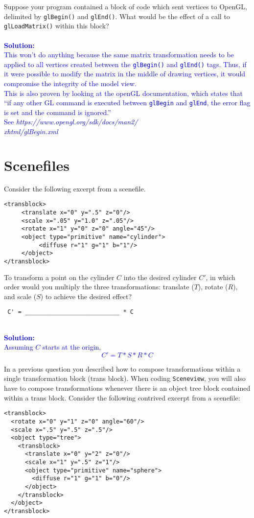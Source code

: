 \documentclass[10pt,twocolumn]{article}
\newcommand{\solution}[1]{\textcolor{Blue}{\\{\bf Solution:} \\ #1}}  %
\begin{document}
\begin{framed}
 Suppose your program contained a block of code which sent vertices to OpenGL, delimited by {\tt glBegin()} and {\tt glEnd()}. What would be the effect of a call to {\tt glLoadMatrix()} within this block?\\[5mm]
\solution{
This won't do anything because the same matrix transformation needs to be applied to all vertices created between the {\tt glBegin()} and {\tt glEnd()} tags. Thus, if it were possible to modify the matrix in the middle of drawing vertices, it would compromise the integrity of the model view. \\[5mm]
This is also proven by looking at the openGL documentation, which states that ``if any other GL command is executed between {\tt glBegin} and {\tt glEnd}, the error flag is set and the command is ignored.''\\[5mm]
See {\it https://www.opengl.org/sdk/docs/man2/\\xhtml/glBegin.xml}
}
\end{framed}

\section{Scenefiles}
Consider the following excerpt from a scenefile.
\begin{verbatim}
<transblock>
     <translate x="0" y=".5" z="0"/>
     <scale x=".05" y="1.0" z=".05"/>
     <rotate x="1" y="0" z="0" angle="45"/>
     <object type="primitive" name="cylinder">
          <diffuse r="1" g="1" b="1"/> 
     </object>
</transblock>
\end{verbatim}

\begin{framed}
  To transform a point on the cylinder $C$ into the desired cylinder $C'$, in which order would you multiply the three transformations: translate ($T$), rotate ($R$), and scale ($S$) to achieve the desired effect?\\
\begin{verbatim}
 C' = ___________________________ * C
\end{verbatim} 
\solution{
Assuming $C$ starts at the origin, 
\[
C' = T * S * R * C
\]
}
\end{framed}

\noindent In a previous question you described how to compose transformations within a single transformation block (trans block). When coding {\tt Sceneview}, you will also have to compose transformations whenever there is an object tree block contained within a trans block. Consider the following contrived excerpt from a scenefile:
\begin{verbatim}
<transblock>
  <rotate x="0" y="1" z="0" angle="60"/> 
  <scale x=".5" y=".5" z=".5"/>
  <object type="tree">
    <transblock>
      <translate x="0" y="2" z="0"/>
      <scale x="1" y=".5" z="1"/>
      <object type="primitive" name="sphere">
        <diffuse r="1" g="1" b="0"/> 
      </object>
    </transblock> 
  </object>
</transblock>
\end{verbatim}
\end{document}
